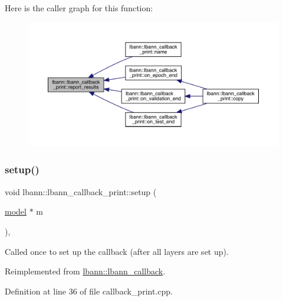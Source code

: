Here is the caller graph for this function\+:\nopagebreak
\begin{figure}[H]
\begin{center}
\leavevmode
\includegraphics[width=350pt]{classlbann_1_1lbann__callback__print_a50117faa3edb961ddd87c5c5806820b2_icgraph}
\end{center}
\end{figure}
\mbox{\label{classlbann_1_1lbann__callback__print_a405e20e9fa137bd377faf692cc3c54aa}} 
\subsubsection{\texorpdfstring{setup()}{setup()}}
{\footnotesize\ttfamily void lbann\+::lbann\+\_\+callback\+\_\+print\+::setup (\begin{DoxyParamCaption}\item[{\hyperlink{classlbann_1_1model}{model} $\ast$}]{m }\end{DoxyParamCaption})\hspace{0.3cm}{\ttfamily [override]}, {\ttfamily [virtual]}}

Called once to set up the callback (after all layers are set up). 

Reimplemented from \hyperlink{classlbann_1_1lbann__callback_aab5086e27d9bb0a7c7ee8ffc1bc58671}{lbann\+::lbann\+\_\+callback}.



Definition at line 36 of file callback\+\_\+print.\+cpp.


